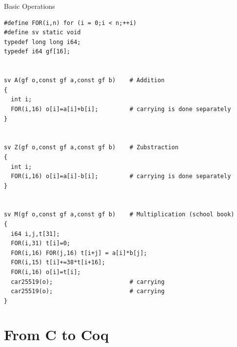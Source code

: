 \documentclass[8pt]{beamer}
\begin{document}
%
%
\begin{frame}[fragile]{Basic Operations}
  \begin{center}

\begin{lstlisting}[language=cnacl]
#define FOR(i,n) for (i = 0;i < n;++i)
#define sv static void
typedef long long i64;
typedef i64 gf[16];


sv A(gf o,const gf a,const gf b)    # Addition
{
  int i;
  FOR(i,16) o[i]=a[i]+b[i];         # carrying is done separately
}


sv Z(gf o,const gf a,const gf b)    # Zubstraction
{
  int i;
  FOR(i,16) o[i]=a[i]-b[i];         # carrying is done separately
}


sv M(gf o,const gf a,const gf b)    # Multiplication (school book)
{
  i64 i,j,t[31];
  FOR(i,31) t[i]=0;
  FOR(i,16) FOR(j,16) t[i+j] = a[i]*b[j];
  FOR(i,15) t[i]+=38*t[i+16];
  FOR(i,16) o[i]=t[i];
  car25519(o);                      # carrying
  car25519(o);                      # carrying
}
\end{lstlisting}

  \end{center}
\end{frame}

\section{From C to Coq}

%
%
\end{document}
